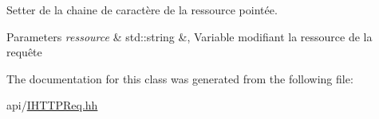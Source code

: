 Setter de la chaine de caractère de la ressource pointée. 


\begin{DoxyParams}{Parameters}
{\em ressource} & std\+::string \&, Variable modifiant la ressource de la requête \\
\hline
\end{DoxyParams}


The documentation for this class was generated from the following file\+:\begin{DoxyCompactItemize}
\item 
api/\hyperlink{_i_h_t_t_p_req_8hh}{I\+H\+T\+T\+P\+Req.\+hh}\end{DoxyCompactItemize}
